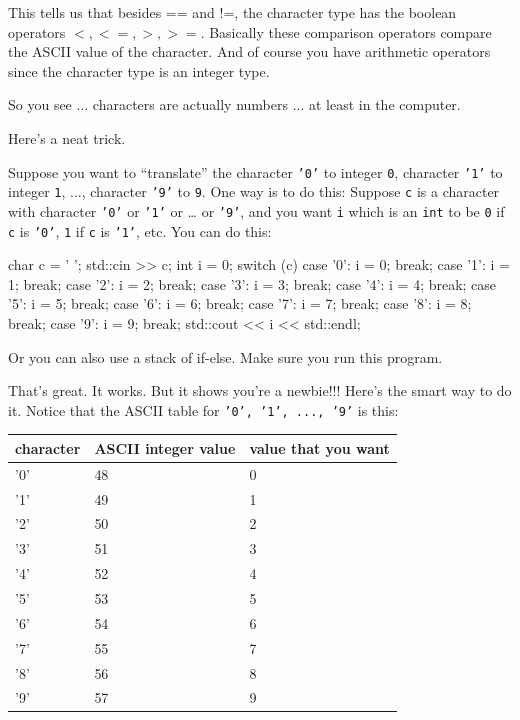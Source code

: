 This tells us that besides == and !=, the character type has the boolean operators $<, <=, >, >=$. Basically these comparison operators compare the ASCII value of the character. And of course you have arithmetic operators since the character type is an integer type.

So you see ... characters are actually numbers ... at least in the computer.


\newpage{}

Here's a neat trick.

Suppose you want to ``translate'' the character \texttt{'0'} to integer \texttt{0}, character \texttt{'1'} to integer \texttt{1}, ..., character \texttt{'9'} to \texttt{9}. One way is to do this: Suppose \texttt{c} is a character with character \texttt{'0'} or \texttt{'1'} or \ldots{} or \texttt{'9'}, and you want \texttt{i} which is an \texttt{int} to be \texttt{0} if \texttt{c} is \texttt{'0'}, \texttt{1} if \texttt{c} is \texttt{'1'}, etc. You can do this:

\begin{consolethree}[escapeinside=||]
char c = ' ';
std::cin >> c;
int i = 0;
switch (c)
{
    case '0': i = 0; break;
    case '1': i = 1; break;
    case '2': i = 2; break;
    case '3': i = 3; break;
    case '4': i = 4; break;
    case '5': i = 5; break;
    case '6': i = 6; break;
    case '7': i = 7; break;
    case '8': i = 8; break;
    case '9': i = 9; break;
}
std::cout << i << std::endl;
\end{consolethree}

Or you can also use a stack of if-else. Make sure you run this program.

That's great. It works. But it shows you're a newbie!!! Here's the smart way to do it. Notice that the ASCII table for \texttt{'0', '1', ..., '9'} is this:

\begin{tabular}{lll}
character & ASCII integer value & value that you want \\
\hline
'0' & 48 & 0 \\
'1' & 49 & 1 \\
'2' & 50 & 2 \\
'3' & 51 & 3 \\
'4' & 52 & 4 \\
'5' & 53 & 5 \\
'6' & 54 & 6 \\
'7' & 55 & 7 \\
'8' & 56 & 8 \\
'9' & 57 & 9 \\
\end{tabular}

